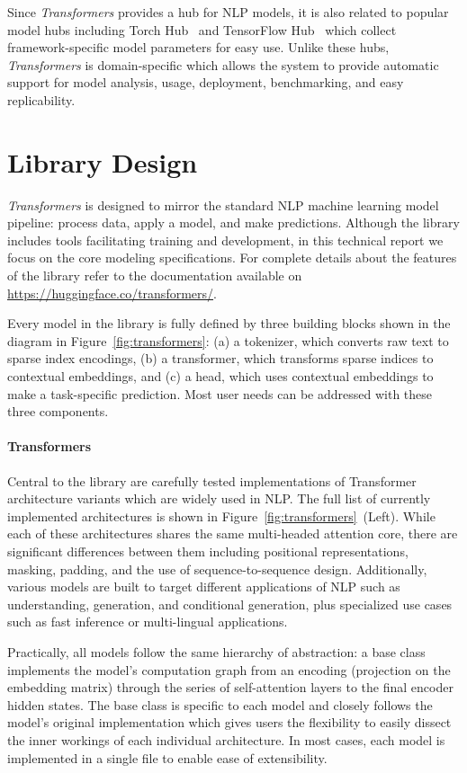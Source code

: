 Since \textit{Transformers} provides a hub for NLP models, it is also related to popular model hubs including Torch Hub~\nocite{noauthor_undated-qt} and TensorFlow Hub~\nocite{noauthor_undated-sy} which collect framework-specific model parameters for easy use. Unlike these hubs, \textit{Transformers} is domain-specific which allows the system to provide automatic support for model analysis, usage, deployment, benchmarking, and easy replicability.

\section{Library Design}

\textit{Transformers} is designed to mirror the standard NLP machine learning model pipeline: process data, apply a model, and make predictions. Although the library includes tools facilitating training and development, in this technical report we focus on the core modeling specifications. For complete details about the features of the library refer to the documentation available on \url{https://huggingface.co/transformers/}.

Every model in the library is fully defined by three building blocks shown in the diagram in Figure~\ref{fig:transformers}: (a) a tokenizer, which converts raw text to sparse index encodings, (b) a transformer, which transforms sparse indices to contextual embeddings, and (c) a head, which uses contextual embeddings to make a task-specific prediction. Most user needs can be addressed with these three components.

\paragraph{Transformers} Central to the library are carefully tested implementations of Transformer architecture variants which are widely used in NLP. The full list of currently implemented architectures is shown in Figure~\ref{fig:transformers}~(Left). While each of these architectures shares the same multi-headed attention core, there are significant differences between them including positional representations, masking, padding, and the use of sequence-to-sequence design. Additionally, various models are built to target different applications of NLP such as understanding, generation, and conditional generation, plus specialized use cases such as fast inference or multi-lingual applications. 

Practically, all models follow the same hierarchy of abstraction: a base class implements the model's computation graph from an encoding (projection on the embedding matrix) through the series of self-attention layers to the final encoder hidden states. The base class is specific to each model and closely follows the model's original implementation which gives users the flexibility to easily dissect the inner workings of each individual architecture. In most cases, each model is implemented in a single file to enable ease of extensibility.

